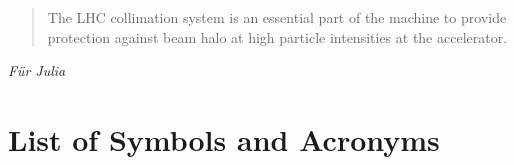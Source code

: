 






\begin{abstract}
  The LHC collimation system is an essential part of the machine to provide protection against beam halo at high particle intensities at the accelerator.
\end{abstract}

\newpage
\thispagestyle{empty}

\begin{flushright}
\textit{F\"{u}r Julia}
\end{flushright}








%
%









\newpage
\section*{List of Symbols and Acronyms}
\glsaddall
\printglossary[type=symbol,style=mylong]%
\printglossary[type=acronym,style=mylong]




%
   


  





  
